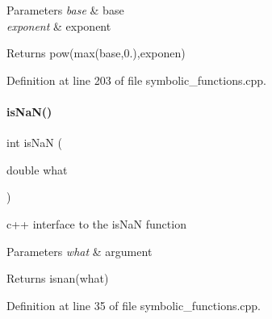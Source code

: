 \begin{DoxyParams}{Parameters}
{\em base} & base \\
\hline
{\em exponent} & exponent \\
\hline
\end{DoxyParams}
\begin{DoxyReturn}{Returns}
pow(max(base,0.),exponen) 
\end{DoxyReturn}


Definition at line 203 of file symbolic\+\_\+functions.\+cpp.

\mbox{\label{namespaceamici_a7452657cd5f8d541f9e823df5e82c516}} 
\paragraph{\texorpdfstring{is\+Na\+N()}{isNaN()}}
{\footnotesize\ttfamily int is\+NaN (\begin{DoxyParamCaption}\item[{double}]{what }\end{DoxyParamCaption})}

c++ interface to the is\+NaN function


\begin{DoxyParams}{Parameters}
{\em what} & argument \\
\hline
\end{DoxyParams}
\begin{DoxyReturn}{Returns}
isnan(what) 
\end{DoxyReturn}


Definition at line 35 of file symbolic\+\_\+functions.\+cpp.

